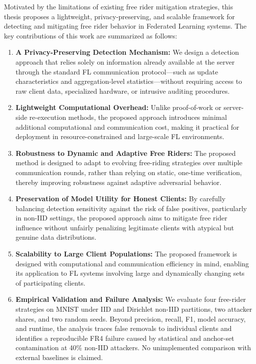 Motivated by the limitations of existing free rider mitigation strategies, this thesis proposes a lightweight, privacy-preserving, and scalable framework for detecting and mitigating free rider behavior in Federated Learning systems. The key contributions of this work are summarized as follows:

\begin{enumerate}
    \item \textbf{A Privacy-Preserving Detection Mechanism:} We design a detection approach that relies solely on information already available at the server through the standard FL communication protocol—such as update characteristics and aggregation-level statistics—without requiring access to raw client data, specialized hardware, or intrusive auditing procedures.

    \item \textbf{Lightweight Computational Overhead:} Unlike proof-of-work or server-side re-execution methods, the proposed approach introduces minimal additional computational and communication cost, making it practical for deployment in resource-constrained and large-scale FL environments.

    \item \textbf{Robustness to Dynamic and Adaptive Free Riders:} The proposed method is designed to adapt to evolving free-riding strategies over multiple communication rounds, rather than relying on static, one-time verification, thereby improving robustness against adaptive adversarial behavior.

    \item \textbf{Preservation of Model Utility for Honest Clients:} By carefully balancing detection sensitivity against the risk of false positives, particularly in non-IID settings, the proposed approach aims to mitigate free rider influence without unfairly penalizing legitimate clients with atypical but genuine data distributions.

    \item \textbf{Scalability to Large Client Populations:} The proposed framework is designed with computational and communication efficiency in mind, enabling its application to FL systems involving large and dynamically changing sets of participating clients.

    \item \textbf{Empirical Validation and Failure Analysis:} We evaluate four free-rider strategies on MNIST under IID and Dirichlet non-IID partitions, two attacker shares, and two random seeds. Beyond precision, recall, F1, model accuracy, and runtime, the analysis traces false removals to individual clients and identifies a reproducible FR4 failure caused by statistical and anchor-set contamination at 40\% non-IID attackers. No unimplemented comparison with external baselines is claimed.
\end{enumerate}

